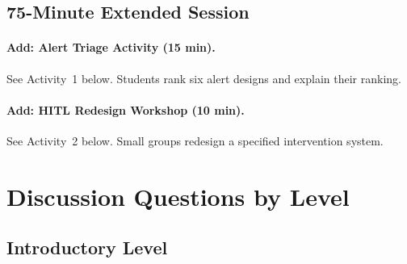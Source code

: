 \subsection{75-Minute Extended Session}

\paragraph{Add: Alert Triage Activity (15 min).}
See Activity~1 below. Students rank six alert designs and explain their ranking.

\paragraph{Add: HITL Redesign Workshop (10 min).}
See Activity~2 below. Small groups redesign a specified intervention system.

\section{Discussion Questions by Level}

\subsection{Introductory Level}

